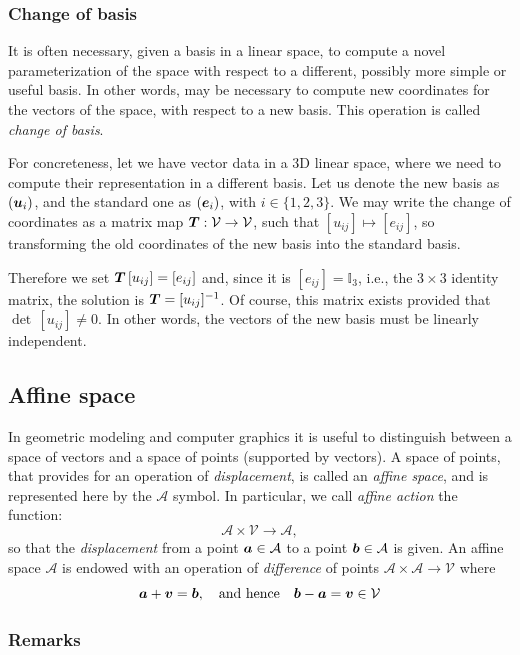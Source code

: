 \subsubsection*{Change of basis} 

It is often necessary, given a basis in a linear space, to compute a novel parameterization of the space with respect to a different, possibly more simple or useful basis. In other words, may be necessary to compute new coordinates for the vectors of the space, with respect to a new basis. This operation is called \emph{change of basis}. 

For concreteness, let we have vector data in a 3D linear space, where we need to compute their representation in a different basis. Let us denote the new basis as $({\mbox{\boldmath $u$}}_i)$, and the standard one as $({\mbox{\boldmath $e$}}_i)$, with $i\in \{1,2,3\}$. We may write the change of coordinates as a matrix map ${\mbox{\boldmath $T$}}: \mathcal{V}\to\mathcal{V}$, such that $[u_{ij}] \mapsto [e_{ij}]$, so transforming the old coordinates of the new basis into the standard basis. 

Therefore we set ${\mbox{\boldmath $T$}}\, [u_{ij}] = [e_{ij}]$ and, since it is $[e_{ij}]=\mathbb{I}_{3}$, i.e., the $3\times 3$ identity matrix, the solution is ${\mbox{\boldmath $T$}}=[u_{ij}]^{-1}$. Of course, this matrix exists provided that $\det\, [u_{ij}] \not= 0$. In other words, the vectors of the new basis must be linearly independent.


\subsection{Affine space}
\label{subsec:2:style}

In geometric modeling and computer graphics it is useful to distinguish between a space of vectors and a space of points (supported by vectors). A space of points, that provides for an operation of \emph{displacement}, is called an \emph{affine space}, and is represented here by the $\mathcal{A}$ symbol. In particular, we call \emph{affine action}  the function:
\[
\mathcal{A} \times \mathcal{V} \to \mathcal{A},
\]
so that  the \emph{displacement} from a point ${\mbox{\boldmath $a$}} \in \mathcal{A}$ to a point ${\mbox{\boldmath $b$}} \in \mathcal{A}$ is given. An affine space $\mathcal{A}$ is endowed with an operation of \emph{difference} of points $\mathcal{A} \times \mathcal{A} \to \mathcal{V}$ where
\[
{\mbox{\boldmath $a$}} + {\mbox{\boldmath $v$}} = {\mbox{\boldmath $b$}}, \quad\mbox{and hence}\quad {\mbox{\boldmath $b$}}-{\mbox{\boldmath $a$}} = {\mbox{\boldmath $v$}} \in \mathcal{V} 
\]

\subsubsection*{Remarks}
\label{sec:ccccccc}

